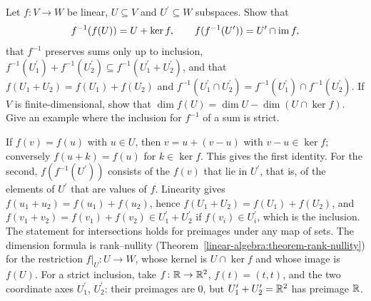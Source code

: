 \begin{exercise}\label{linear-algebra:exercise-images-preimages}
Let $f \colon V \to W$ be linear, $U \subseteq V$ and $U^{\prime} \subseteq W$ subspaces. Show that
\[
f^{-1}(f(U)) = U + \ker f, \qquad f(f^{-1}(U^{\prime})) = U^{\prime} \cap \operatorname{im} f,
\]
that $f^{-1}$ preserves sums only up to inclusion, $f^{-1}(U_1^{\prime}) + f^{-1}(U_2^{\prime}) \subseteq f^{-1}(U_1^{\prime} + U_2^{\prime})$, and that $f(U_1 + U_2) = f(U_1) + f(U_2)$ and $f^{-1}(U_1^{\prime} \cap U_2^{\prime}) = f^{-1}(U_1^{\prime}) \cap f^{-1}(U_2^{\prime})$.
If $V$ is finite-dimensional, show that $\dim f(U) = \dim U - \dim(U \cap \ker f)$. Give an example where the inclusion for $f^{-1}$ of a sum is strict.
\end{exercise}

\begin{solution}
If $f(v) = f(u)$ with $u \in U$, then $v = u + (v - u)$ with $v - u \in \ker f$; conversely $f(u + k) = f(u)$ for $k \in \ker f$. This gives the first identity. For the second, $f(f^{-1}(U^{\prime}))$ consists of the
$f(v)$ that lie in $U^{\prime}$, that is, of the elements of $U^{\prime}$ that are values of $f$. Linearity gives $f(u_1 + u_2) = f(u_1) + f(u_2)$, hence $f(U_1 + U_2) = f(U_1) + f(U_2)$, and
$f(v_1 + v_2) = f(v_1) + f(v_2) \in U_1^{\prime} + U_2^{\prime}$ if $f(v_i) \in U_i^{\prime}$, which is the inclusion. The statement for intersections holds for preimages under any map of sets. The dimension formula is
rank--nullity (Theorem~\ref{linear-algebra:theorem-rank-nullity}) for the restriction $f|_U \colon U \to W$, whose kernel is $U \cap \ker f$ and whose image is $f(U)$. For a strict inclusion, take
$f \colon \mathbb{R} \to \mathbb{R}^2$, $f(t) = (t, t)$, and the two coordinate axes $U_1^{\prime}$, $U_2^{\prime}$: their preimages are $0$, but $U_1^{\prime} + U_2^{\prime} = \mathbb{R}^2$ has preimage $\mathbb{R}$.
\end{solution}
